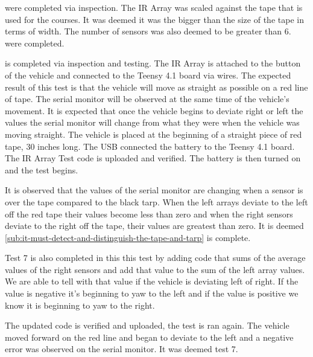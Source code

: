 \documentclass[11pt]{report}
\begin{document}
\label{tst:ir-array-observation}
 were completed via inspection. The \gls{IR} Array was scaled against the tape that is used for the courses. It was deemed it was the bigger than the size of the tape in terms of width. The number of sensors was also deemed to be greater than 6.  were completed. 

\label{tst:ir-array-detection}
 is completed via inspection and testing. The \gls{IR} Array is attached to the button of the vehicle and connected to the Teensy 4.1 board via wires. The expected result of this test is that the vehicle will move as straight as possible on a red line of tape. The serial monitor will be observed at the same time of the vehicle’s movement. It is expected that once the vehicle begins to deviate right or left the values the serial monitor will change from what they were when the vehicle was moving straight. The vehicle is placed at the beginning of a straight piece of red tape, 30 inches long. The USB connected the battery to the Teensy 4.1 board. The \gls{IR} Array Test code is uploaded and verified. The battery is then turned on and the test begins. 

It is observed that the values of the serial monitor are changing when a sensor is over the tape compared to the black tarp. When the left arrays deviate to the left off the red tape their values become less than zero and when the right sensors deviate to the right off the tape, their values are greatest than zero. It is deemed \cref{sub:it-must-detect-and-distinguish-the-tape-and-tarp} is complete. 



Test 7 is also completed in this this test by adding code that sums of the average values of the right sensors and add that value to the sum of the left array values. We are able to tell with that value if the vehicle is deviating left of right. If the value is negative it’s beginning to yaw to the left and if the value is positive we know it is beginning to yaw to the right. 

The updated code is verified and uploaded, the test is ran again. The vehicle moved forward on the red line and began to deviate to the left and a negative error was observed on the serial monitor. It was deemed test 7.
\end{document}
